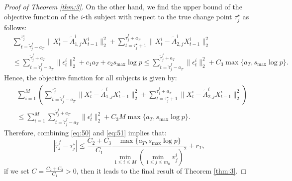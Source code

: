 \documentclass[11pt]{article}
\begin{document}
\begin{proof}[Proof of Theorem \ref{thm:3}]
On the other hand, we find the upper bound of the objective function of the $i$-th subject with respect to the true change point $\tau_j^\star$ as follows:
\begin{equation*}
    \begin{aligned}
        &\sum_{t=\widetilde{\tau}^f_j-a_T}^{\tau_j^\star}\|X_t^i - \widetilde{A}^i_{1,j}X_{t-1}^i\|_2^2 + \sum_{t=\tau_j^\star + 1}^{\widetilde{\tau}^f_j+a_T}\|X_t^i - \widetilde{A}^i_{2,j}X_{t-1}^i\|_2^2 \\
        &\leq \sum_{t=\widetilde{\tau}^f_j-a_T}^{\widetilde{\tau}^f_j+a_T}\|\epsilon_t^i\|_2^2 + c_1a_T + c_2s_{\max}\log p \leq \sum_{t=\widetilde{\tau}^f_j-a_T}^{\widetilde{\tau}^f_j+a_T}\|\epsilon_t^i\|_2^2 + C_3\max\{a_T, s_{\max}\log p\}.
    \end{aligned}
\end{equation*}
Hence, the objective function for all subjects is given by:
\begin{equation}
    \label{eq:51}
    \begin{aligned}
        &\sum_{i=1}^M\left( \sum_{t=\widetilde{\tau}^f_j-a_T}^{\tau_j^\star}\|X_t^i - \widetilde{A}^i_{1,j}X_{t-1}^i\|_2^2 + \sum_{t=\tau_j^\star + 1}^{\widetilde{\tau}^f_j+a_T}\|X_t^i - \widetilde{A}^i_{2,j}X_{t-1}^i\|_2^2 \right) \\
        &\leq \sum_{i=1}^M\sum_{t=\widetilde{\tau}_j^f-a_T}^{\widetilde{\tau}^f_j+a_T}\|\epsilon_t^i\|_2^2 + C_3 M\max\{a_T, s_{\max}\log p\}.
    \end{aligned}
\end{equation}
Therefore, combining \eqref{eq:50} and \eqref{eq:51} implies that:
\begin{equation*}
    |\widetilde{\tau}_j^f - \tau_j^\star| \leq \frac{C_2+C_3}{C_1}\frac{\max\{ a_T, s_{\max}\log p\}}{\min_{1\leq i\leq M}(\min_{1\leq j \leq m_0}v_j^i)^2} + r_T,
\end{equation*}
if we set $C = \frac{C_2+C_3}{C_1}>0$, then it leads to the final result of Theorem \ref{thm:3}.

\end{proof}
\end{document}
